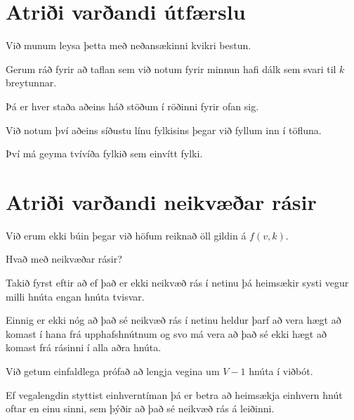 \section{Atriði varðandi útfærslu}
{
    {
        \item<1-> Við munum leysa þetta með neðansækinni kvikri bestun.
            \item<2-> Gerum ráð fyrir að taflan sem við notum fyrir minnun hafi dálk sem svari til $k$ breytunnar.
            \item<3-> Þá er hver staða aðeins háð stöðum í röðinni fyrir ofan sig.
            \item<4-> Við notum því aðeins síðustu línu fylkisins þegar við fyllum inn í töfluna.
            \item<5-> Því má geyma tvívíða fylkið sem einvítt fylki.
    }
}

\section{Atriði varðandi neikvæðar rásir}
{
    {
        \item<1-> Við erum ekki búin þegar við höfum reiknað öll gildin á $f(v, k)$.
            \item<2-> Hvað með neikvæðar rásir?
            \item<3-> Takið fyrst eftir að ef það er ekki neikvæð rás í netinu þá heimsækir systi vegur milli hnúta engan hnúta tvisvar.
            \item<4-> Einnig er ekki nóg að það sé neikvæð rás í netinu heldur þarf að vera hægt að komast í hana frá upphafshnútnum
            og svo má vera að það sé ekki hægt að komast frá rásinni í alla aðra hnúta.
            \item<5-> Við getum einfaldlega prófað að lengja vegina um $V - 1$ hnúta í viðbót.
            \item<6-> Ef vegalengdin styttist einhverntíman þá er betra að heimsækja einhvern hnút oftar en einu sinni,
            sem þýðir að það sé neikvæð rás á leiðinni.
    }
}

